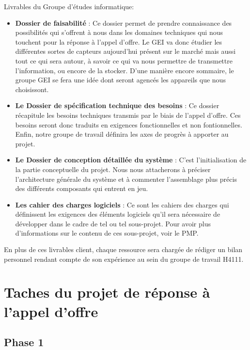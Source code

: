 Livrables du Groupe d'études informatique:

\begin{itemize}
\item \textbf{Dossier de faisabilité} : Ce dossier permet de prendre connaissance des possibilités qui s'offrent à nous dans les domaines techniques qui nous touchent pour la réponse à l'appel d'offre. Le GEI va donc étudier les différentes sortes de capteurs aujourd'hui présent sur le marché mais aussi tout ce qui sera autour, à savoir ce qui va nous permettre de transmettre l'information, ou encore de la stocker. D'une manière encore sommaire, le groupe GEI se fera une idée dont seront agencés les appareils que nous choisissont.
\item \textbf{Le Dossier de spécification technique des besoins} : Ce dossier récapitule les besoins techniques transmis par le biais de l'appel d'offre. Ces besoins seront donc traduits en exigences fonctionnelles et non fontionnelles. Enfin, notre groupe de travail définira les axes de progrès à apporter au projet.
\item \textbf{Le Dossier de conception détaillée du système} :  C'est l'initialisation de la partie conceptuelle du projet. Nous nous attacherons à préciser l'architecture générale du système et à commenter l'assemblage plus précis des différents composants qui entrent en jeu.
\item \textbf{Les cahier des charges logiciels} :  Ce sont les cahiers des charges qui définissent les exigences des éléments logiciels qu'il sera nécessaire de développer dans le cadre de tel ou tel sous-projet. Pour avoir plus d'informations sur le contenu de ces sous-projet, voir le PMP.
\end{itemize}

En plus de ces livrables client, chaque ressource sera chargée de rédiger un bilan personnel rendant compte de son expérience au sein du groupe de travail H4111.


\section{Taches du projet de réponse à l'appel d'offre}

\subsection{Phase 1}

